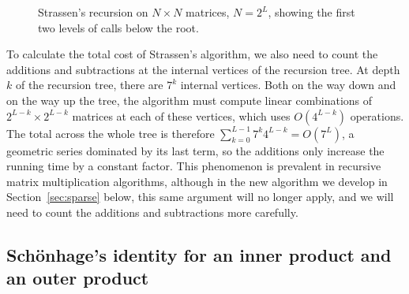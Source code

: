 \begin{figure}[tb]
\centering
{}
\caption{Strassen's recursion on $N\times N$ matrices, $N=2^L$, showing the first two levels of calls below the root.}
\label{fig:strassen}
\end{figure}

To calculate the total cost of Strassen's algorithm, we also need to count the additions and subtractions at the internal vertices of the recursion tree. At depth $k$ of the recursion tree, there are $7^k$ internal vertices. Both on the way down and on the way up the tree, the algorithm must compute linear combinations of $2^{L-k}\times2^{L-k}$ matrices at each of these vertices, which uses $O(4^{L-k})$ operations. The total across the whole tree is therefore $\sum_{k=0}^{L-1}7^k4^{L-k}=O(7^L)$, a geometric series dominated by its last term, so the additions only increase the running time by a constant factor. This phenomenon is prevalent in recursive matrix multiplication algorithms, although in the new algorithm we develop in Section~\ref{sec:sparse} below, this same argument will no longer apply, and we will need to count the additions and subtractions more carefully.

\subsection{Sch\"onhage's identity for an inner product and an outer product}\label{sec:identity}


